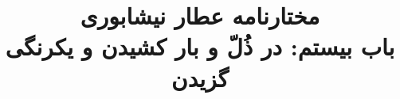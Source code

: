\documentclass[14pt,b5paper]{article}
\begin{document}
\title{\Huge مختارنامه عطار نیشابوری \\
باب بیستم: در ذُلّ و بار کشیدن و یکرنگی گزیدن}
\author{ }
\date{ }
\maketitle
\newpage
\tableofcontents
\newpage

\newpage

\newpage

\newpage

\newpage

\newpage

\newpage

\newpage

\newpage

\newpage

\newpage

\newpage

\newpage

\newpage

\newpage

\newpage

\newpage

\newpage

\newpage

\newpage

\newpage

\newpage

\newpage

\newpage

\newpage

\newpage

\newpage

\newpage

\newpage

\newpage
\end{document}
